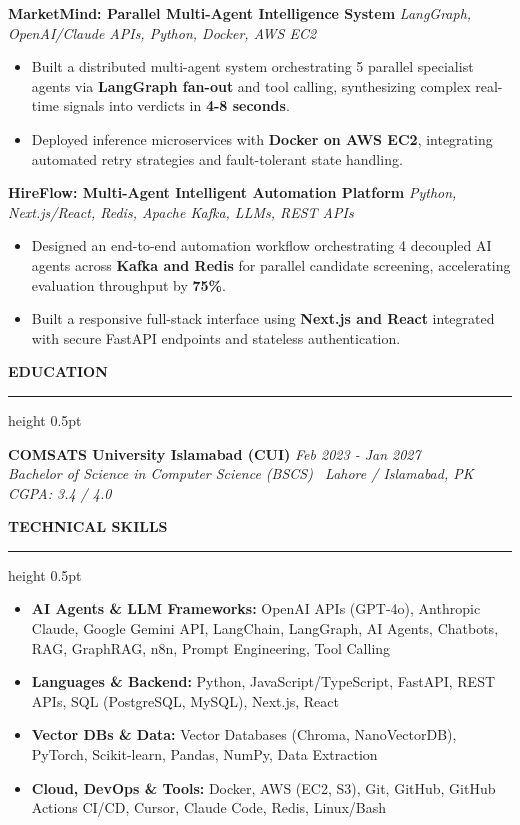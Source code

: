 \documentclass[10pt,letterpaper]{article}
\newcommand{\resumesection}[1]{%
  \vspace{3.0pt}%
  {\fontsize{10pt}{11.5pt}\selectfont\textbf{\MakeUppercase{#1}}}%
  \vspace{1.0pt}%
  \hrule height 0.5pt%
  \vspace{2.0pt}%
}
\begin{document}
\vspace{1.5pt}
\noindent\textbf{MarketMind: Parallel Multi-Agent Intelligence System} \hfill \textit{LangGraph, OpenAI/Claude APIs, Python, Docker, AWS EC2}
\begin{itemize}
  \item Built a distributed multi-agent system orchestrating 5 parallel specialist agents via \textbf{LangGraph fan-out} and tool calling, synthesizing complex real-time signals into verdicts in \textbf{4-8 seconds}.
  \item Deployed inference microservices with \textbf{Docker on AWS EC2}, integrating automated retry strategies and fault-tolerant state handling.
\end{itemize}

\vspace{1.5pt}
\noindent\textbf{HireFlow: Multi-Agent Intelligent Automation Platform} \hfill \textit{Python, Next.js/React, Redis, Apache Kafka, LLMs, REST APIs}
\begin{itemize}
  \item Designed an end-to-end automation workflow orchestrating 4 decoupled AI agents across \textbf{Kafka and Redis} for parallel candidate screening, accelerating evaluation throughput by \textbf{75\%}.
  \item Built a responsive full-stack interface using \textbf{Next.js and React} integrated with secure FastAPI endpoints and stateless authentication.
\end{itemize}

\resumesection{Education}
\noindent\textbf{COMSATS University Islamabad (CUI)} \hfill \textit{Feb 2023 - Jan 2027} \\
\textit{Bachelor of Science in Computer Science (BSCS) \textbar\ Lahore / Islamabad, PK} \hfill \textit{CGPA: 3.4 / 4.0}

\resumesection{Technical Skills}
\begin{itemize}[leftmargin=0pt, label={}]
  \item \textbf{AI Agents \& LLM Frameworks:} OpenAI APIs (GPT-4o), Anthropic Claude, Google Gemini API, LangChain, LangGraph, AI Agents, Chatbots, RAG, GraphRAG, n8n, Prompt Engineering, Tool Calling
  \item \textbf{Languages \& Backend:} Python, JavaScript/TypeScript, FastAPI, REST APIs, SQL (PostgreSQL, MySQL), Next.js, React
  \item \textbf{Vector DBs \& Data:} Vector Databases (Chroma, NanoVectorDB), PyTorch, Scikit-learn, Pandas, NumPy, Data Extraction
  \item \textbf{Cloud, DevOps \& Tools:} Docker, AWS (EC2, S3), Git, GitHub, GitHub Actions CI/CD, Cursor, Claude Code, Redis, Linux/Bash
\end{itemize}
\end{document}
